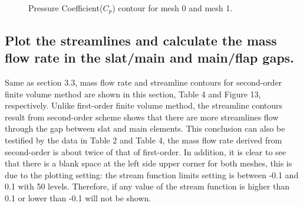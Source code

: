 \documentclass[letterpaper,onecolumn,12pt]{article}
\makeatletter
\newenvironment{tablehere}
  {\def\@captype{table}}{}
\makeatother
\begin{document}
\begin{figure}
 \centering 
  \hspace{.05cm} 
  \caption{Pressure Coefficient($C_p$) contour for mesh 0 and mesh 1.} 
\end{figure}

\subsection{Plot the streamlines and calculate the mass flow rate in the slat/main and main/flap gaps.}

Same as section 3.3, mass flow rate and streamline contours for second-order finite volume method are shown in this section, Table 4 and Figure 13, respectively. Unlike first-order finite volume method, the streamline contours result from second-order scheme shows that there are more streamlines flow through the gap between slat and main elements. This conclusion can also be testified by the data in Table 2 and Table 4, the mass flow rate derived from second-order is about twice of that of first-order. In addition, it is clear to see that there is a blank space at the left side upper corner for both meshes, this is due to the plotting setting: the stream function limits setting is between -0.1 and 0.1 with 50 levels. Therefore, if any value of the stream function is higher than 0.1 or lower than -0.1 will not be shown.

\bigskip

\begin{tablehere}
\centering
{}
\qquad
{}
\caption{Mass flow rate between the main/slap, main/flap gaps, for mesh 0 and mesh 1.}
\end{tablehere}
\end{document}
